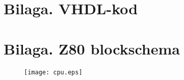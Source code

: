 \documentclass[main.tex]{subfiles}
\begin{document}
\appendix
\section{Bilaga. VHDL-kod}


\newpage
{}
\recalctypearea

\section{Bilaga. Z80 blockschema}
\begin{figure}[H]
    \hspace{-25mm}
    \texttt{[image: cpu.eps]}
\end{figure}

\newpage
{}
\recalctypearea
\end{document}
